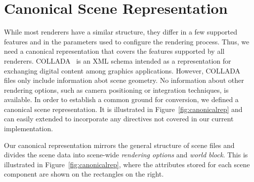 \section{Canonical Scene Representation}
While most renderers have a similar structure, they differ in a few supported features and in the parameters used to configure the rendering process. Thus, we need a canonical representation that covers the features supported by all renderers. 
%
 COLLADA~\cite{collada} is an XML schema intended as a representation for exchanging digital content among graphics applications. 
 However, COLLADA files only include information abot scene geometry. No information about other rendering 
 options, such as camera positioning or integration techniques, is available. 
 In order to establish a common ground for conversion, we defined a canonical scene representation. It 
 is illustrated in Figure~\ref{fig:canonicalrep} and can easily extended to incorporate any directives not covered in our current implementation.
 


Our canonical representation mirrors the general structure of scene files and divides the scene data into
scene-wide {\it rendering options} and {\it world block}. 
This is illustrated in Figure~\ref{fig:canonicalrep}, where the attributes stored for each scene component are shown on the rectangles on the right.

